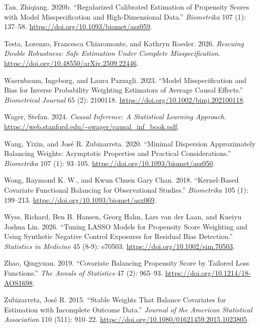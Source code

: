 \documentclass[
  12pt,
  a4paper,
]{article}
\newlength{\cslhangindent}
\newenvironment{CSLReferences}[2] %
 {\begin{list}{}{%
  \setlength{\itemindent}{0pt}
  \setlength{\leftmargin}{0pt}
  \setlength{\parsep}{0pt}
  \ifodd #1
   \setlength{\leftmargin}{\cslhangindent}
   \setlength{\itemindent}{-1\cslhangindent}
  \fi
  \setlength{\itemsep}{#2\baselineskip}}}
 {\end{list}}
\begin{document}
\begin{CSLReferences}{1}{1}
Tan, Zhiqiang. 2020b. {``Regularized Calibrated Estimation of Propensity
Scores with Model Misspecification and High-Dimensional Data.''}
\emph{Biometrika} 107 (1): 137--58.
\url{https://doi.org/10.1093/biomet/asz059}.

Testa, Lorenzo, Francesca Chiaromonte, and Kathryn Roeder. 2026.
\emph{Rescuing Double Robustness: Safe Estimation Under Complete
Misspecification}. \url{https://doi.org/10.48550/arXiv.2509.22446}.

Waernbaum, Ingeborg, and Laura Pazzagli. 2023. {``Model Misspecification
and Bias for Inverse Probability Weighting Estimators of Average Causal
Effects.''} \emph{Biometrical Journal} 65 (2): 2100118.
\url{https://doi.org/10.1002/bimj.202100118}.

Wager, Stefan. 2024. \emph{Causal Inference: A Statistical Learning
Approach}. \url{https://web.stanford.edu/~swager/causal_inf_book.pdf}.

Wang, Yixin, and José R. Zubizarreta. 2020. {``Minimal Dispersion
Approximately Balancing Weights: Asymptotic Properties and Practical
Considerations.''} \emph{Biometrika} 107 (1): 93--105.
\url{https://doi.org/10.1093/biomet/asz050}.

Wong, Raymond K. W., and Kwun Chuen Gary Chan. 2018. {``Kernel-Based
Covariate Functional Balancing for Observational Studies.''}
\emph{Biometrika} 105 (1): 199--213.
\url{https://doi.org/10.1093/biomet/asx069}.

{Wyss, Richard, Ben B. Hansen, Georg Hahn, Lars van der Laan, and Kueiyu
Joshua Lin}. 2026. {``Tuning {LASSO} Models for Propensity Score
Weighting and Using Synthetic Negative Control Exposures for Residual
Bias Detection.''} \emph{Statistics in Medicine} 45 (8-9): e70503.
\url{https://doi.org/10.1002/sim.70503}.

Zhao, Qingyuan. 2019. {``Covariate Balancing Propensity Score by
Tailored Loss Functions.''} \emph{The Annals of Statistics} 47 (2):
965--93. \url{https://doi.org/10.1214/18-AOS1698}.

Zubizarreta, José R. 2015. {``Stable Weights That Balance Covariates for
Estimation with Incomplete Outcome Data.''} \emph{Journal of the
American Statistical Association} 110 (511): 910--22.
\url{https://doi.org/10.1080/01621459.2015.1023805}.

\end{CSLReferences}
\end{document}
